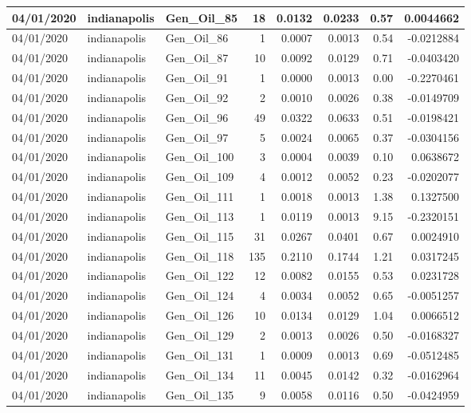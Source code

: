 \documentclass[
  letterpaper,
  DIV=11,
  numbers=noendperiod]{scrartcl}
\begin{document}
\begin{tabular}{l|l|l|r|r|r|r|r}
\hline
04/01/2020 & indianapolis & Gen\_Oil\_85 & 18 & 0.0132 & 0.0233 & 0.57 & 0.0044662\\
\hline
04/01/2020 & indianapolis & Gen\_Oil\_86 & 1 & 0.0007 & 0.0013 & 0.54 & -0.0212884\\
\hline
04/01/2020 & indianapolis & Gen\_Oil\_87 & 10 & 0.0092 & 0.0129 & 0.71 & -0.0403420\\
\hline
04/01/2020 & indianapolis & Gen\_Oil\_91 & 1 & 0.0000 & 0.0013 & 0.00 & -0.2270461\\
\hline
04/01/2020 & indianapolis & Gen\_Oil\_92 & 2 & 0.0010 & 0.0026 & 0.38 & -0.0149709\\
\hline
04/01/2020 & indianapolis & Gen\_Oil\_96 & 49 & 0.0322 & 0.0633 & 0.51 & -0.0198421\\
\hline
04/01/2020 & indianapolis & Gen\_Oil\_97 & 5 & 0.0024 & 0.0065 & 0.37 & -0.0304156\\
\hline
04/01/2020 & indianapolis & Gen\_Oil\_100 & 3 & 0.0004 & 0.0039 & 0.10 & 0.0638672\\
\hline
04/01/2020 & indianapolis & Gen\_Oil\_109 & 4 & 0.0012 & 0.0052 & 0.23 & -0.0202077\\
\hline
04/01/2020 & indianapolis & Gen\_Oil\_111 & 1 & 0.0018 & 0.0013 & 1.38 & 0.1327500\\
\hline
04/01/2020 & indianapolis & Gen\_Oil\_113 & 1 & 0.0119 & 0.0013 & 9.15 & -0.2320151\\
\hline
04/01/2020 & indianapolis & Gen\_Oil\_115 & 31 & 0.0267 & 0.0401 & 0.67 & 0.0024910\\
\hline
04/01/2020 & indianapolis & Gen\_Oil\_118 & 135 & 0.2110 & 0.1744 & 1.21 & 0.0317245\\
\hline
04/01/2020 & indianapolis & Gen\_Oil\_122 & 12 & 0.0082 & 0.0155 & 0.53 & 0.0231728\\
\hline
04/01/2020 & indianapolis & Gen\_Oil\_124 & 4 & 0.0034 & 0.0052 & 0.65 & -0.0051257\\
\hline
04/01/2020 & indianapolis & Gen\_Oil\_126 & 10 & 0.0134 & 0.0129 & 1.04 & 0.0066512\\
\hline
04/01/2020 & indianapolis & Gen\_Oil\_129 & 2 & 0.0013 & 0.0026 & 0.50 & -0.0168327\\
\hline
04/01/2020 & indianapolis & Gen\_Oil\_131 & 1 & 0.0009 & 0.0013 & 0.69 & -0.0512485\\
\hline
04/01/2020 & indianapolis & Gen\_Oil\_134 & 11 & 0.0045 & 0.0142 & 0.32 & -0.0162964\\
\hline
04/01/2020 & indianapolis & Gen\_Oil\_135 & 9 & 0.0058 & 0.0116 & 0.50 & -0.0424959\\

\end{tabular}
\end{document}
